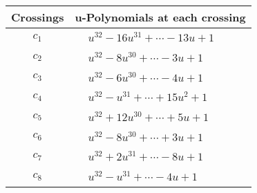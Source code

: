 \documentclass[1p]{elsarticle_modified}
\theoremstyle{definition}
\begin{document}
\begin{tabular}{m{50pt}|m{274pt}}
Crossings & \hspace{64pt}u-Polynomials at each crossing \\
\hline $$\begin{aligned}c_{1}\end{aligned}$$&$\begin{aligned}
&u^{32}-16 u^{31}+\cdots-13 u+1
\end{aligned}$\\
\hline $$\begin{aligned}c_{2}\end{aligned}$$&$\begin{aligned}
&u^{32}-8 u^{30}+\cdots-3 u+1
\end{aligned}$\\
\hline $$\begin{aligned}c_{3}\end{aligned}$$&$\begin{aligned}
&u^{32}-6 u^{30}+\cdots-4 u+1
\end{aligned}$\\
\hline $$\begin{aligned}c_{4}\end{aligned}$$&$\begin{aligned}
&u^{32}- u^{31}+\cdots+15 u^2+1
\end{aligned}$\\
\hline $$\begin{aligned}c_{5}\end{aligned}$$&$\begin{aligned}
&u^{32}+12 u^{30}+\cdots+5 u+1
\end{aligned}$\\
\hline $$\begin{aligned}c_{6}\end{aligned}$$&$\begin{aligned}
&u^{32}-8 u^{30}+\cdots+3 u+1
\end{aligned}$\\
\hline $$\begin{aligned}c_{7}\end{aligned}$$&$\begin{aligned}
&u^{32}+2 u^{31}+\cdots-8 u+1
\end{aligned}$\\
\hline $$\begin{aligned}c_{8}\end{aligned}$$&$\begin{aligned}
&u^{32}- u^{31}+\cdots-4 u+1
\end{aligned}$\\

\end{tabular}
\end{document}
